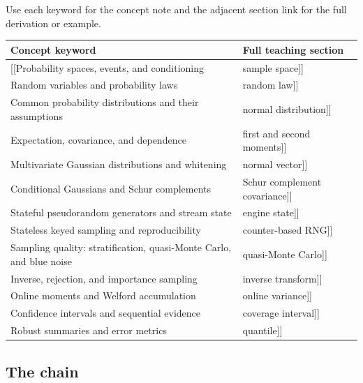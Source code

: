 Use each keyword for the concept note and the adjacent section link for the full derivation or example.

{\def\LTcaptype{none} %
\begin{longtable}[]{@{}
  >{\raggedright\arraybackslash}p{}
  >{\raggedright\arraybackslash}p{}@{}}
\toprule\noalign{}
\begin{minipage}[b]{\linewidth}\raggedright
Concept keyword
\end{minipage} & \begin{minipage}[b]{\linewidth}\raggedright
Full teaching section
\end{minipage} \\
\midrule\noalign{}
\endhead
\bottomrule\noalign{}
\endlastfoot
{[}{[}Probability spaces, events, and conditioning & sample space{]}{]} \\
{[}{[}Random variables and probability laws & random law{]}{]} \\
{[}{[}Common probability distributions and their assumptions & normal distribution{]}{]} \\
{[}{[}Expectation, covariance, and dependence & first and second moments{]}{]} \\
{[}{[}Multivariate Gaussian distributions and whitening & normal vector{]}{]} \\
{[}{[}Conditional Gaussians and Schur complements & Schur complement covariance{]}{]} \\
{[}{[}Stateful pseudorandom generators and stream state & engine state{]}{]} \\
{[}{[}Stateless keyed sampling and reproducibility & counter-based RNG{]}{]} \\
{[}{[}Sampling quality: stratification, quasi-Monte Carlo, and blue noise & quasi-Monte Carlo{]}{]} \\
{[}{[}Inverse, rejection, and importance sampling & inverse transform{]}{]} \\
{[}{[}Online moments and Welford accumulation & online variance{]}{]} \\
{[}{[}Confidence intervals and sequential evidence & coverage interval{]}{]} \\
{[}{[}Robust summaries and error metrics & quantile{]}{]} \\
\end{longtable}
}

\subsection{The chain}\label{appendix-cb5af353ef77-the-chain}

